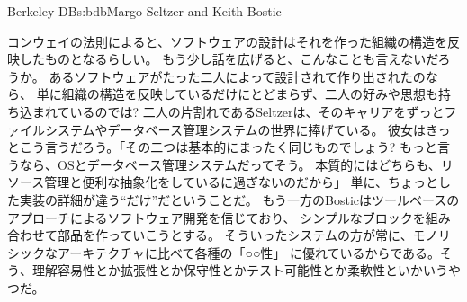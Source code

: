 \begin{aosachapter}{Berkeley DB}{s:bdb}{Margo Seltzer and Keith Bostic}

コンウェイの法則によると、ソフトウェアの設計はそれを作った組織の構造を反映したものとなるらしい。
もう少し話を広げると、こんなことも言えないだろうか。
あるソフトウェアがたった二人によって設計されて作り出されたのなら、
単に組織の構造を反映しているだけにとどまらず、二人の好みや思想も持ち込まれているのでは?
二人の片割れであるSeltzerは、そのキャリアをずっとファイルシステムやデータベース管理システムの世界に捧げている。
彼女はきっとこう言うだろう。「その二つは基本的にまったく同じものでしょう?
もっと言うなら、OSとデータベース管理システムだってそう。
本質的にはどちらも、リソース管理と便利な抽象化をしているに過ぎないのだから」
単に、ちょっとした実装の詳細が違う``だけ''だということだ。
もう一方のBosticはツールベースのアプローチによるソフトウェア開発を信じており、
シンプルなブロックを組み合わせて部品を作っていこうとする。
そういったシステムの方が常に、モノリシックなアーキテクチャに比べて各種の「○○性」
に優れているからである。そう、理解容易性とか拡張性とか保守性とかテスト可能性とか柔軟性といかいうやつだ。


\end{aosachapter}
